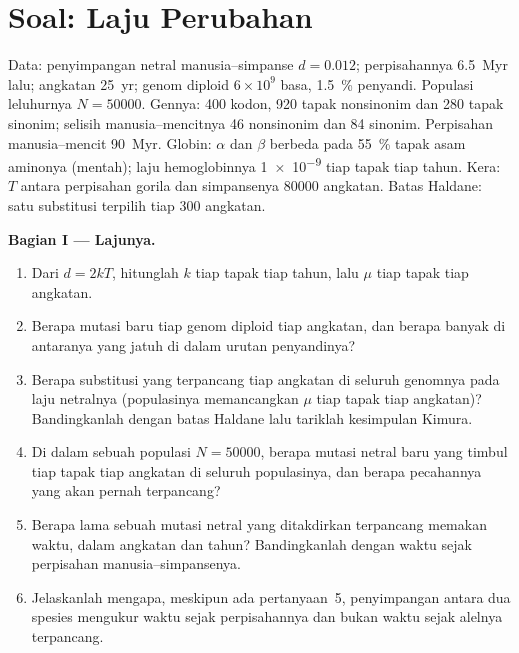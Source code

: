 \section{Soal: Laju Perubahan}

\begin{problem}
\label{pb:b3:molecular-evolution:1}
Data: penyimpangan netral manusia--simpanse $d = 0.012$; perpisahannya
\qty{6.5}{Myr} lalu; angkatan \qty{25}{yr}; genom diploid $6\times
10^{9}$ basa, \qty{1.5}{\%} penyandi. Populasi leluhurnya $N =
\num{50000}$. Gennya: 400 kodon, 920 tapak nonsinonim dan 280 tapak sinonim;
selisih manusia--mencitnya 46 nonsinonim dan 84 sinonim.
Perpisahan manusia--mencit \qty{90}{Myr}. Globin: $\alpha$ dan $\beta$ berbeda pada
\qty{55}{\%} tapak asam aminonya (mentah); laju hemoglobinnya \num{1e-9} tiap
tapak tiap tahun. Kera: $T$ antara perpisahan gorila dan simpansenya
\num{80000} angkatan. Batas Haldane: satu substitusi terpilih tiap
300 angkatan.

\medskip
\noindent\textbf{Bagian I --- Lajunya.}
\begin{enumerate}
  \item Dari $d = 2kT$, hitunglah $k$ tiap tapak tiap tahun, lalu $\mu$ tiap
        tapak tiap angkatan.
  \item Berapa mutasi baru tiap genom diploid tiap angkatan, dan berapa banyak di
        antaranya yang jatuh di dalam urutan penyandinya?
  \item Berapa substitusi yang terpancang tiap angkatan di seluruh genomnya pada
        laju netralnya (populasinya memancangkan $\mu$ tiap tapak tiap
        angkatan)? Bandingkanlah dengan batas Haldane lalu tariklah
        kesimpulan Kimura.
  \item Di dalam sebuah populasi $N = \num{50000}$, berapa mutasi netral baru
        yang timbul tiap tapak tiap angkatan di seluruh populasinya,
        dan berapa pecahannya yang akan pernah terpancang?
  \item Berapa lama sebuah mutasi netral yang ditakdirkan terpancang memakan waktu, dalam
        angkatan dan tahun? Bandingkanlah dengan waktu sejak
        perpisahan manusia--simpansenya.
  \item Jelaskanlah mengapa, meskipun ada pertanyaan~5, penyimpangan antara dua
        spesies mengukur waktu sejak perpisahannya dan bukan waktu
        sejak alelnya terpancang.
\end{enumerate}


\end{problem}
